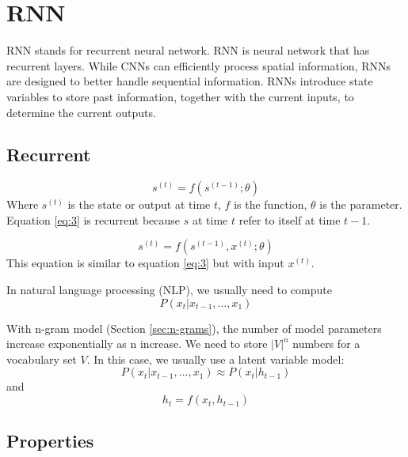 
\chapter{RNN}
\label{cha:rnn}

RNN stands for recurrent neural network.
RNN is neural network that has recurrent layers.
While CNNs can efficiently process spatial information, RNNs are designed to better handle sequential information.
RNNs introduce state variables to store past information, together with the current inputs, to determine the current outputs.

\section{Recurrent}
\label{sec:recurrent}

\begin{equation}
  \label{eq:3}
  s^{(t)} = f(s^{(t-1)}; \theta)
\end{equation}
Where \(s^{(t)}\) is the state or output at time \(t\), \(f\) is the function, \(\theta\) is the parameter.
Equation \ref{eq:3} is recurrent because \(s\) at time \(t\) refer to itself at time \(t-1\).


\begin{equation}
  \label{eq:4}
  s^{(t)} = f(s^{(t-1)}, x^{(t)}; \theta)
\end{equation}
This equation is similar to equation \ref{eq:3} but with input \(x^{(t)}\).


In natural language processing (NLP), we usually need to compute
\begin{equation}
  \label{eq:nlp}
  P(x_{t}|x_{t-1},\ldots,x_{1})
\end{equation}

With n-gram model (Section \ref{sec:n-grams}), the number of model parameters increase exponentially as n increase.
We need to store \(|V|^{n}\) numbers for a vocabulary set \(V\).
In this case, we usually use a latent variable model:
\begin{equation}
  \label{eq:rnn-model}
  P(x_{t}|x_{t-1},\ldots,x_{1}) \approx P(x_{t}|h_{t-1})
\end{equation}
and
\begin{equation}
  \label{eq:latent}
  h_{t} = f(x_{t},h_{t-1})
\end{equation}


\section{Properties}
\label{sec:properties}


